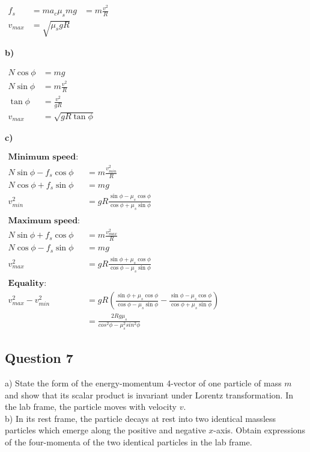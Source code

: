 \documentclass{article}
\begin{document}
$\begin{aligned}
f_s &= ma_c \mu_s mg &= m \frac{v^2}{R} \\
v_{max} &= \sqrt{\mu_s g R}
\end{aligned}$

\textbf{b)}

$\begin{aligned}
N \cos \phi &= mg \\
N \sin \phi &= m \frac{v^2}{R} \\
\tan \phi &= \frac{v^2}{gR} \\
v_{max} &= \sqrt{gR \tan \phi}
\end{aligned}$

\textbf{c)}

$\begin{aligned}
\textbf{Minimum speed:} \\
N \sin \phi - f_s \cos \phi &= m \frac{v_{min}^2}{R} \\
N \cos \phi + f_s \sin \phi &= mg \\
v_{min}^2 &= gR \frac{\sin \phi - \mu_s \cos \phi}{\cos \phi + \mu_s \sin \phi} \\
\\
\textbf{Maximum speed:} \\
N \sin \phi + f_s \cos \phi &= m \frac{v_{max}^2}{R} \\
N \cos \phi - f_s \sin \phi &= mg \\
v_{max}^2 &= gR \frac{\sin \phi + \mu_s \cos \phi}{\cos \phi - \mu_s \sin \phi} \\
\\
\textbf{Equality:} \\
v_{max}^2 - v_{min}^2 &= gR \left( \frac{\sin \phi + \mu_s \cos \phi}{\cos \phi - \mu_s \sin \phi} - \frac{\sin \phi - \mu_s \cos \phi}{\cos \phi + \mu_s \sin \phi} \right) \\
&= \frac{2Rg \mu_s}{cos^2 \phi - \mu_s^2 sin^2 \phi}
\end{aligned}$

\subsection{Question 7}

a) State the form of the energy-momentum 4-vector of one particle of mass \(m\) and show that its scalar product is invariant under Lorentz transformation. In the lab frame, the particle moves with velocity \(v\). \\ 

b) In its rest frame, the particle decays at rest into two identical massless particles which emerge along the positive and negative \(x\)-axis. Obtain expressions of the four-momenta of the two identical particles in the lab frame. \\ 
\end{document}
